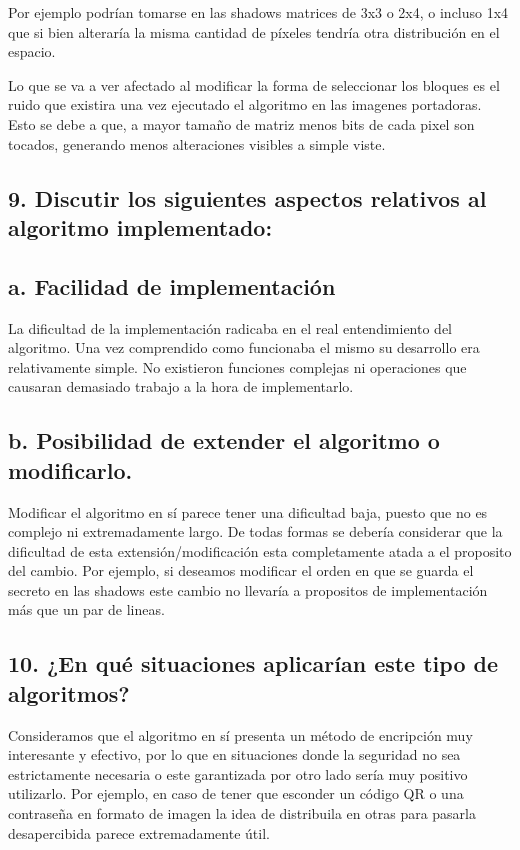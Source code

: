 \documentclass[11pt]{scrartcl} %
\begin{document}
Por ejemplo podrían tomarse en las shadows matrices de 3x3 o 2x4, o incluso 1x4 que si bien alteraría la misma cantidad de píxeles tendría otra distribución en el espacio. 

Lo que se va a ver afectado al modificar la forma de seleccionar los bloques es el ruido que existira una vez ejecutado el algoritmo en las imagenes portadoras. Esto se debe a que, a mayor tamaño de matriz menos bits de cada pixel son tocados, generando menos alteraciones visibles a simple viste.
\subsection{9. Discutir los siguientes aspectos relativos al algoritmo implementado:}
	\subsection{a. Facilidad de implementación}

La dificultad de la implementación radicaba en el real entendimiento del algoritmo. Una vez comprendido como funcionaba el mismo su desarrollo era relativamente simple. No existieron funciones complejas ni operaciones que causaran demasiado trabajo a la hora de implementarlo.

	\subsection{b. Posibilidad de extender el algoritmo o modificarlo.}
	
Modificar el algoritmo en sí parece tener una dificultad baja, puesto que no es complejo ni extremadamente largo. De todas formas se debería considerar que la dificultad de esta extensión/modificación esta completamente atada a el proposito del cambio. Por ejemplo, si deseamos modificar el orden en que se guarda el secreto en las shadows este cambio no llevaría a propositos de implementación más que un par de lineas. 

\subsection{10. ¿En qué situaciones aplicarían este tipo de algoritmos?}

Consideramos que el algoritmo en sí presenta un método de encripción muy interesante y efectivo, por lo que en situaciones donde la seguridad no sea estrictamente necesaria o este garantizada por otro lado sería muy positivo utilizarlo. Por ejemplo, en caso de tener que esconder un código QR o una contraseña en formato de imagen la idea de distribuila en otras para pasarla desapercibida parece extremadamente útil.
\end{document}

